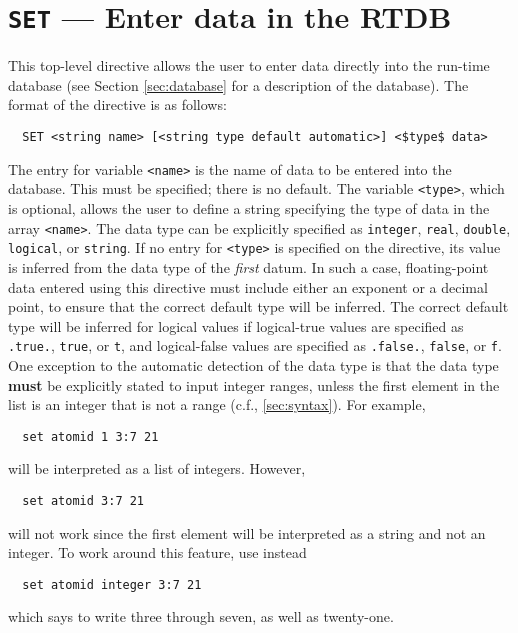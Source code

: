\section{{\tt SET} --- Enter data in the RTDB}
\label{sec:set}

This top-level directive allows the user to enter data directly into the
run-time
database (see Section \ref{sec:database} for a description of the database).
The format of the directive is as follows:

\begin{verbatim}
  SET <string name> [<string type default automatic>] <$type$ data>
\end{verbatim}

The entry for variable \verb+<name>+ is the name of 
data to be entered into the database.  This must be specified; there is no default.  The variable \verb+<type>+, which is
optional, allows the user to define a string specifying the type of
data in the array \verb+<name>+.  The data type can be explicitly
specified as \verb+integer+, \verb+real+, \verb+double+,
\verb+logical+, or \verb+string+.  If no entry for \verb+<type>+ is
specified on the directive, its value is inferred from the data type
of the {\em first} datum.  In such a case, floating-point data
entered using this directive must include either an exponent or a
decimal point, to ensure that the correct default type will be
inferred.  The correct default type will be inferred for logical
values if logical-true values are specified as \verb+.true.+,
\verb+true+, or \verb+t+, and logical-false values are specified as
\verb+.false.+, \verb+false+, or \verb+f+.  One exception to the
automatic detection of the data type is that the data type {\bf must}
be explicitly stated to input integer ranges, unless the first
element in the list is an integer that is not a range (c.f.,
\ref{sec:syntax}).  For example,
\begin{verbatim}
  set atomid 1 3:7 21
\end{verbatim}
will be interpreted as a list of integers.  However, 
\begin{verbatim}
  set atomid 3:7 21
\end{verbatim}
will not work since the first element will be interpreted as a
string and not an integer.  To work around this feature, use instead
\begin{verbatim}
  set atomid integer 3:7 21
\end{verbatim}
which says to write  three through seven, as well as twenty-one.


